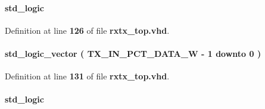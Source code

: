 \paragraph[{inst0\+\_\+reset\+\_\+n}]{ {\bfseries \textcolor{comment}{std\+\_\+logic}\textcolor{vhdlchar}{ }} \hspace{0.3cm}{\ttfamily [Signal]}}\label{classrxtx__top_1_1arch_a4b6af19981b4822cfccf8892d8029d53}


Definition at line {\bf 126} of file {\bf rxtx\+\_\+top.\+vhd}.

\paragraph[{inst0\+\_\+tx\+\_\+fifo\+\_\+data}]{ {\bfseries \textcolor{comment}{std\+\_\+logic\+\_\+vector}\textcolor{vhdlchar}{ }\textcolor{vhdlchar}{(}\textcolor{vhdlchar}{ }\textcolor{vhdlchar}{ }\textcolor{vhdlchar}{ }\textcolor{vhdlchar}{ }{\bfseries {\bf T\+X\+\_\+\+I\+N\+\_\+\+P\+C\+T\+\_\+\+D\+A\+T\+A\+\_\+W}} \textcolor{vhdlchar}{-\/}\textcolor{vhdlchar}{ } \textcolor{vhdldigit}{1} \textcolor{vhdlchar}{ }\textcolor{keywordflow}{downto}\textcolor{vhdlchar}{ }\textcolor{vhdlchar}{ } \textcolor{vhdldigit}{0} \textcolor{vhdlchar}{ }\textcolor{vhdlchar}{)}\textcolor{vhdlchar}{ }} \hspace{0.3cm}{\ttfamily [Signal]}}\label{classrxtx__top_1_1arch_a1ccd6f6835f7342bcdd0855febfcb9a4}


Definition at line {\bf 131} of file {\bf rxtx\+\_\+top.\+vhd}.

\paragraph[{inst0\+\_\+tx\+\_\+fifo\+\_\+wr}]{ {\bfseries \textcolor{comment}{std\+\_\+logic}\textcolor{vhdlchar}{ }} \hspace{0.3cm}{\ttfamily [Signal]}}\label{classrxtx__top_1_1arch_a7428384f261ee698d6c663efe0317383}


